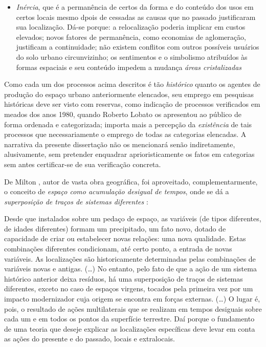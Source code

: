 \begin{itemize}
\item \textit{Inércia}, que é a permanência de certos da forma e do conteúdo dos usos em certos locais mesmo dpois de cessadas as causas que no passado justificaram sua localização. Dá-se porque: a relocalização poderia implicar em custos elevados; novos fatores de permanência, como economias de aglomeração, justificam a continuidade; não existem conflitos com outros possíveis usuários do solo urbano circunvizinho; os sentimentos e o simbolismo atribuídos às formas espaciais e seu conteúdo impedem a mudança \textit{áreas cristalizadas}\cite[p.~76-79]{CORREA1985espa}
\end{itemize}

Como cada um dos processos acima descritos é tão \textit{histórico} quanto os agentes de produção do espaço urbano anteriormente elencados, seu emprego em pesquisas históricas deve ser visto com reservas, como indicação de processos verificados em meados dos anos 1980, quando Roberto Lobato  os apresentou ao público de forma ordenada e categorizada; importa mais a percepção da \textit{existência} de tais processos que necessariamente o emprego de todas as categorias elencadas. A narrativa da presente dissertação não os mencionará senão indiretamente, alusivamente, sem pretender enquadrar aprioristicamente os fatos em categorias sem antes certificar-se de sua verificação concreta.

De Milton , autor de vasta obra geográfica, foi aproveitado, complementarmente, o conceito de \textit{espaço como acumulação desigual de tempos}, onde se dá a \textit{superposição de traços de sistemas diferentes} \cite[p.~256-257]{SANTOS2008}:

\begin{citacao}
Desde que instalados sobre um pedaço de espaço, as variáveis (de tipos diferentes, de idades diferentes) formam um precipitado, um fato novo, dotado de capacidade de criar ou estabelecer novas relações: uma nova qualidade. Estas combinações diferentes condicionam, até certo ponto, a entrada de novas variáveis. As localizações são historicamente determinadas pelas combinações de variáveis novas e antigas. (…) No entanto, pelo fato de que a ação de um sistema histórico anterior deixa resíduos, há uma superposição de traços de sistemas diferentes, exceto no caso de espaços virgens, tocados pela primeira vez por um impacto modernizador cuja origem se encontra em forças externas. (…) O lugar é, pois, o resultado de ações multilaterais que se realizam em tempos desiguais sobre cada um e em todos os pontos da superfície terrestre. Daí porque o fundamento de uma teoria que deseje explicar as localizações específicas deve levar em conta as ações do presente e do passado, locais e extralocais. \cite[p.~256-258]{SANTOS2008}
\end{citacao}

